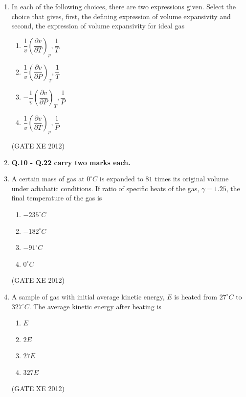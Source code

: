 \documentclass[12pt]{article}
\begin{document}
\begin{enumerate}
\item In each of the following choices, there are two expressions given. Select the choice that gives, first, the defining expression of volume expansivity and second, the expression of volume expansivity for ideal gas  
\begin{multicols}{2}
\begin{enumerate}
    \item $\dfrac{1}{v}\left(\dfrac{\partial v}{\partial T}\right)_p, \dfrac{1}{T}$  
    \item $\dfrac{1}{v}\left(\dfrac{\partial v}{\partial P}\right)_T, \dfrac{1}{T}$  
    \item $-\dfrac{1}{v}\left(\dfrac{\partial v}{\partial P}\right)_T, \dfrac{1}{P}$  
    \item $\dfrac{1}{v}\left(\dfrac{\partial v}{\partial T}\right)_p, \dfrac{1}{P}$  
\end{enumerate}
\end{multicols}
(GATE XE 2012)

\item[] \textbf{Q.10 - Q.22 carry two marks each.}

\item A certain mass of gas at $0^{\circ}C$ is expanded to $81$ times its original volume under adiabatic conditions. If ratio of specific heats of the gas, $\gamma = 1.25$, the final temperature of the gas is  
\begin{multicols}{4}
\begin{enumerate}
    \item $-235^{\circ}C$  
    \item $-182^{\circ}C$  
    \item $-91^{\circ}C$  
    \item $0^{\circ}C$  
\end{enumerate}
\end{multicols}
(GATE XE 2012)

\item A sample of gas with initial average kinetic energy, $E$ is heated from $27^{\circ}C$ to $327^{\circ}C$. The average kinetic energy after heating is  
\begin{multicols}{4}
\begin{enumerate}
    \item $E$  
    \item $2E$  
    \item $27E$  
    \item $327E$  
\end{enumerate}
\end{multicols}
(GATE XE 2012)


\end{enumerate}
\end{document}
